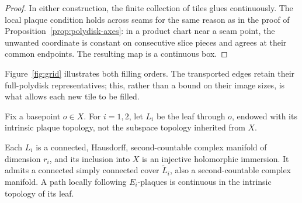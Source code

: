 \begin{proof}
In either construction, the finite collection of tiles glues
continuously. The local plaque condition holds across seams for the
same reason as in the proof of Proposition~\ref{prop:polydisk-axes}:
in a product chart near a seam point, the unwanted coordinate is
constant on consecutive slice pieces and agrees at their common
endpoints. The resulting map is a continuous box.
\end{proof}

Figure~\ref{fig:grid} illustrates both filling orders. The transported
edges retain their full-polydisk representatives; this, rather than a
bound on their image sizes, is what allows each new tile to be filled.


Fix a basepoint \(o\in X\). For \(i=1,2\), let \(L_i\) be the
leaf through \(o\), endowed with its intrinsic plaque topology, not
the subspace topology inherited from \(X\).

\begin{lemma}\label{lem:leaves}
Each \(L_i\) is a connected, Hausdorff, second-countable complex
manifold of dimension \(r_i\), and its inclusion into \(X\) is an
injective holomorphic immersion. It admits a connected simply connected
cover \(\widetilde L_i\), also a second-countable complex manifold.
A path locally following \(E_i\)-plaques is continuous in the intrinsic
topology of its leaf.
\end{lemma}

